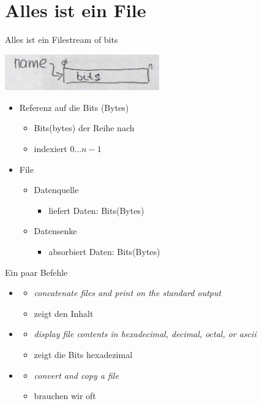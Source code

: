\documentclass{beamer}
\begin{document}
\section{Alles ist ein File}
\begin{frame}{Alles ist ein File}{stream of bits}
 \begin{center}
  \includegraphics[width=0.5\textwidth]{file-bits.jpg}
 \end{center}
 \begin{itemize}
  \item {} Referenz auf die Bits (Bytes)
  \begin{itemize}
   \item Bits(bytes) der Reihe nach
   \item indexiert $0\dots n-1$
  \end{itemize}
  \item File
  \begin{itemize}
   \item Datenquelle
   \begin{itemize}
	\item liefert Daten: Bits(Bytes)
   \end{itemize}
   \item Datensenke
   \begin{itemize}
	\item absorbiert Daten: Bits(Bytes)
   \end{itemize}
  \end{itemize}
 \end{itemize}
\end{frame}

\begin{frame}{Ein paar Befehle}
 \begin{itemize}
  \item {} 
  \begin{itemize}
   \item {\em concatenate files and print on the standard output}
   \item zeigt den Inhalt
  \end{itemize}
  \item {}
  \begin{itemize}
   \item {\em display  file  contents  in hexadecimal, decimal, octal, or ascii}
   \item zeigt die Bits hexadezimal
  \end{itemize}
  \item {}
  \begin{itemize}
   \item {\em convert and copy a file}
   \item brauchen wir oft
  \end{itemize}
 \end{itemize}
\end{frame}
\end{document}
